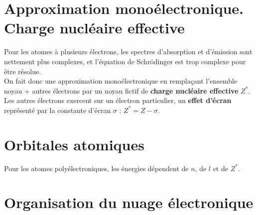\documentclass[13pt, twoside, a4paper, french, tikz]{report}
\begin{document}
  
  \section{Approximation monoélectronique. Charge nucléaire effective}\label{sec:approximation-monoelectronique.-charge-nucleaire-effective}
    
    Pour les atomes à plusieurs électrons, les spectres d'absorption et d'émission sont nettement plus complexes, et l'équation de Schrödinger est trop complexe pour être résolue.\\
    
    On fait donc une approximation monoélectronique en remplaçant l'ensemble {noyau + autres électrons} par un noyau fictif de \textbf{charge nucléaire effective} $Z^*$.\\
    Les autres électrons exercent sur un électron particulier, un \textbf{effet d'écran} représenté par la constante d'écran $\sigma$ : $Z^* = Z - \sigma$.
  
  
  \section{Orbitales atomiques}\label{sec:orbitales-atomiques}
    
    Pour les atomes polyélectroniques, les énergies dépendent de $n$, de $l$ et de $Z^*$.
  
  
  \section{Organisation du nuage électronique}\label{sec:organisation-du-nuage-electronique}
    
\end{document}
